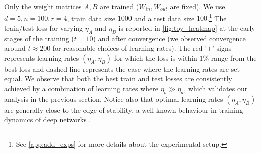 Only the weight matrices $A, B$ are trained ($W_{in}, W_{out}$ are fixed). We use $d=5, n=100, r=4$, train data size $1000$ and a test data size $100$.\footnote{See \cref{app:add_exps} for more details about the experimental setup.} The train/test loss for varying $\eta_A$ and $\eta_B$ is reported in \cref{fig:toy_heatmap} at the early stages of the training ($t=10$) and after convergence (we observed convergence around $t \approx 200$ for reasonable choices of learning rates). The red '$+$' signs represents learning rates $(\eta_A, \eta_B)$ for which the loss is within $1\%$ range from the best loss and dashed line represents the case where the learning rates are set equal. We observe that both the best train and test losses are consistently achieved by a combination of learning rates where $\eta_b \gg \eta_a$, which validates our analysis in the previous section. Notice also that optimal learning rates $(\eta_A, \eta_B)$ are generally close to the edge of stability, a well-known behaviour in training dynamics of deep networks \citep{cohen2021gradient}.